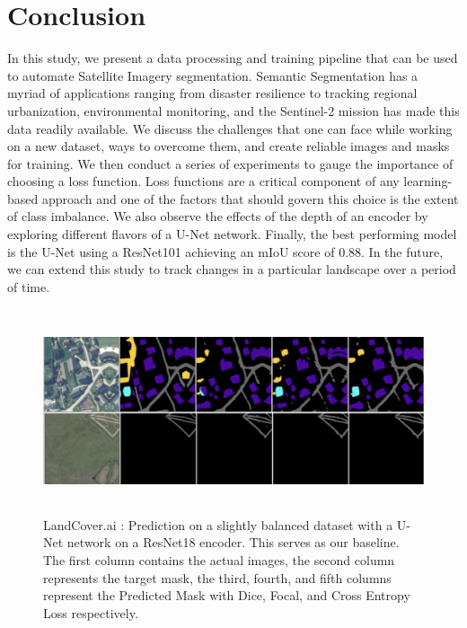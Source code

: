 \documentclass[conference]{IEEEtran}
\begin{document}
\section{Conclusion}

In this study, we present a data processing and training pipeline that can be used to automate Satellite Imagery segmentation. Semantic Segmentation has a myriad of applications ranging from disaster resilience to tracking regional urbanization, environmental monitoring, and the Sentinel-2 mission has made this data readily available. We discuss the challenges that one can face while working on a new dataset, ways to overcome them, and create reliable images and masks for training. We then conduct a series of experiments to gauge the importance of choosing a loss function. Loss functions are a critical component of any learning-based approach and one of the factors that should govern this choice is the extent of class imbalance. We also observe the effects of the depth of an encoder by exploring different flavors of a U-Net network. Finally, the best performing model is the U-Net using a ResNet101 achieving an mIoU score of 0.88. In the future, we can extend this study to track changes in a particular landscape over a period of time.

\begin{figure}
    \centering
    \includegraphics[height=6cm]{images/roads-losses/roads-smaller.png}
    \caption{LandCover.ai : Prediction on a slightly balanced dataset with a U-Net network on a ResNet18 encoder. This serves as our baseline. The first column contains the actual images, the second column represents the target mask, the third, fourth, and fifth columns represent the Predicted Mask with Dice, Focal, and Cross Entropy Loss respectively.}
\end{figure}
\end{document}
